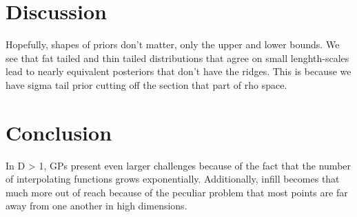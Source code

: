 \documentclass{article}
\begin{document}
\section{Discussion}

Hopefully, shapes of priors don't matter, only the upper and lower bounds. We
see that fat tailed and thin tailed distributions that agree on small
lenghth-scales lead to nearly equivalent posteriors that don't have the ridges.
This is because we have sigma tail prior cutting off the section that part of
rho space.

\section{Conclusion}

In D > 1, GPs present even larger challenges because of the fact that the
number of interpolating functions grows exponentially. Additionally, 
infill becomes that much more out of reach because of the peculiar
problem that most points are far away from one another in high dimensions.
\end{document}
